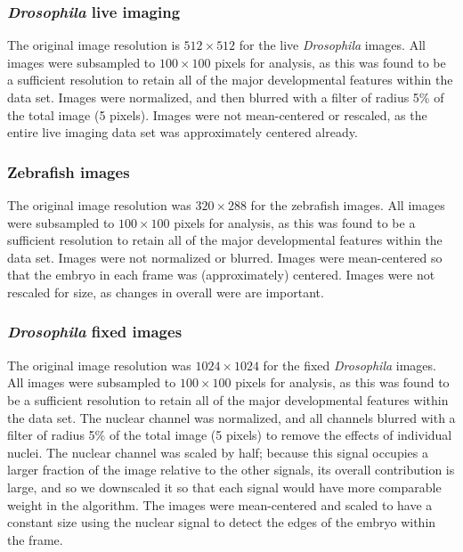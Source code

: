 \documentclass[10pt,twocolumn]{article}
\begin{document}
\subsubsection*{{\em Drosophila} live imaging}

%
The original image resolution is $512 \times 512$ for the live {\em Drosophila} images.
%
All images were subsampled to $100 \times 100$ pixels for analysis, as this was found to be a sufficient resolution to retain all of the major developmental features within the data set. 
%
Images were normalized, and then blurred with a filter of radius 5\% of the total image (5 pixels). 
%
Images were not mean-centered or rescaled, as the entire live imaging data set was approximately centered already.

\subsubsection*{Zebrafish images}

The original image resolution was $320 \times 288$ for the zebrafish images.
%
All images were subsampled to $100 \times 100$ pixels for analysis, as this was found to be a sufficient resolution to retain all of the major developmental features within the data set. 
%
Images were not normalized or blurred.
%
Images were mean-centered so that the embryo in each frame was (approximately) centered. 
%
Images were not rescaled for size, as changes in overall were are important. 

\subsubsection*{{\em Drosophila} fixed images}

The original image resolution was $1024 \times 1024$ for the fixed {\em Drosophila} images.
%
All images were subsampled to $100 \times 100$ pixels for analysis, as this was found to be a sufficient resolution to retain all of the major developmental features within the data set. 
%
The nuclear channel was normalized, and all channels blurred with a filter of radius 5\% of the total image (5 pixels) to remove the effects of individual nuclei. 
%
The nuclear channel was scaled by half; because this signal occupies a larger fraction of the image relative to the other signals, its overall contribution is large, and so we downscaled it so that each signal would have more comparable weight in the algorithm. 
%
The images were mean-centered and scaled to have a constant size using the nuclear signal to detect the edges of the embryo within the frame.
\end{document}
